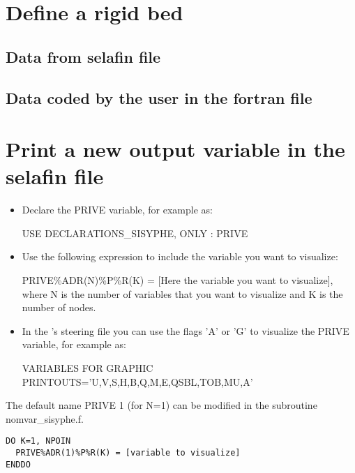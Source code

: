 \section{Define a rigid bed}
\subsection{Data from selafin file}
\subsection{Data coded by the user in the fortran file}

\section{Print a new output variable in the selafin file}
\begin{itemize}
\item Declare the {\ttfamily PRIVE} variable, for example as:
  
{\ttfamily USE DECLARATIONS\_SISYPHE, ONLY : PRIVE}

\item Use the following expression to include the variable you want to visualize:

{\ttfamily PRIVE\%ADR(N)\%P\%R(K) = [Here the variable you want to visualize]}, where {\ttfamily N} is the number of variables that you want to visualize and {\ttfamily K} is the number of nodes.  

\item In the \sisyphe's steering file you can use the flags {\ttfamily'A'} or {\ttfamily'G'} to visualize the {\ttfamily PRIVE} variable, for example as:
  
{\ttfamily VARIABLES FOR GRAPHIC PRINTOUTS='U,V,S,H,B,Q,M,E,QSBL,TOB,MU,A'}
\end{itemize}

The default name {\ttfamily PRIVE 1} (for {\ttfamily N=1}) can be modified in the subroutine {\ttfamily nomvar\_sisyphe.f}.

\begin{lstlisting}[frame=trBL]
DO K=1, NPOIN
  PRIVE%ADR(1)%P%R(K) = [variable to visualize]
ENDDO  
\end{lstlisting}  

